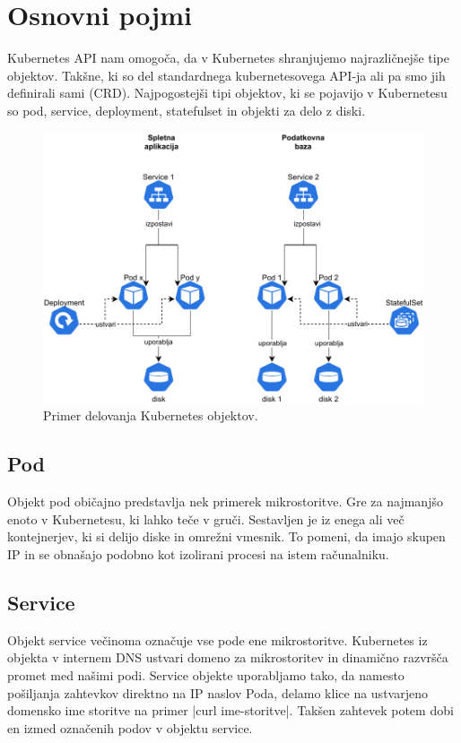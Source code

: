 \documentclass[a4paper, 12pt]{book}
\begin{document}
\section{Osnovni pojmi}
Kubernetes API nam omogoča, da v Kubernetes shranjujemo najrazličnejše tipe objektov.
Takšne, ki so del standardnega kubernetesovega API-ja ali pa smo jih definirali sami (CRD).
Najpogostejši tipi objektov, ki se pojavijo v Kubernetesu so pod, service, deployment, statefulset in objekti za delo z diski.
\begin{figure}[h]
\begin{center}
\includegraphics[width=1.0\textwidth]{images/Kubernetes-simple-schema.pdf}
\end{center}
\caption{Primer delovanja Kubernetes objektov.}
\label{problem-povezanih-clustrov}
\end{figure}
\subsection{Pod~\cite{pod}}
Objekt pod običajno predstavlja nek primerek mikrostoritve.
Gre za najmanjšo enoto v Kubernetesu, ki lahko teče v gruči.
Sestavljen je iz enega ali več kontejnerjev, ki si delijo diske in omrežni vmesnik.
To pomeni, da imajo skupen IP in se obnašajo podobno kot izolirani procesi na istem računalniku.
\subsection{Service~\cite{service}}
Objekt service večinoma označuje vse pode ene mikrostoritve.
Kubernetes iz objekta v internem DNS ustvari domeno za mikrostoritev in dinamično razvršča promet med našimi podi.
Service objekte uporabljamo tako, da namesto pošiljanja zahtevkov direktno na IP naslov Poda, delamo klice na ustvarjeno domensko ime storitve na primer \spverb|curl ime-storitve|.
Takšen zahtevek potem dobi en izmed označenih podov v objektu service.
\end{document}
